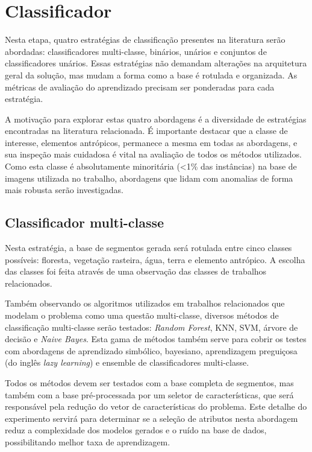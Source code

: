 \section{Classificador}\label{sec:metClassificador}

Nesta etapa, quatro estratégias de classificação presentes na literatura serão abordadas: classificadores multi-classe, binários, unários e conjuntos de classificadores unários. Essas estratégias não demandam alterações na arquitetura geral da solução, mas mudam a forma como a base é rotulada e organizada. As métricas de avaliação do aprendizado precisam ser ponderadas para cada estratégia.

A motivação para explorar estas quatro abordagens é a diversidade de estratégias encontradas na literatura relacionada. É importante destacar que a classe de interesse, elementos antrópicos, permanece a mesma em todas as abordagens, e sua inspeção mais cuidadosa é vital na avaliação de todos os métodos utilizados. Como esta classe é absolutamente minoritária (<1\% das instâncias) na base de imagens utilizada no trabalho, abordagens que lidam com anomalias de forma mais robusta serão investigadas.

\subsection{Classificador multi-classe}

Nesta estratégia, a base de segmentos gerada será rotulada entre cinco classes possíveis: floresta, vegetação rasteira, água, terra e elemento antrópico. A escolha das classes foi feita através de uma observação das classes de trabalhos relacionados.

Também observando os algoritmos utilizados em trabalhos relacionados que modelam o problema como uma questão multi-classe, diversos métodos de classificação multi-classe serão testados: \textit{Random Forest}, KNN, SVM, árvore de decisão e \textit{Naive Bayes}. Esta gama de métodos também serve para cobrir os testes com abordagens de aprendizado simbólico, bayesiano, aprendizagem preguiçosa (do inglês \textit{lazy learning}) e ensemble de classificadores multi-classe.

Todos os métodos devem ser testados com a base completa de segmentos, mas também com a base pré-processada por um seletor de características, que será responsável pela redução do vetor de características do problema. Este detalhe do experimento servirá para determinar se a seleção de atributos nesta abordagem reduz a complexidade dos modelos gerados e o ruído na base de dados, possibilitando melhor taxa de aprendizagem.

